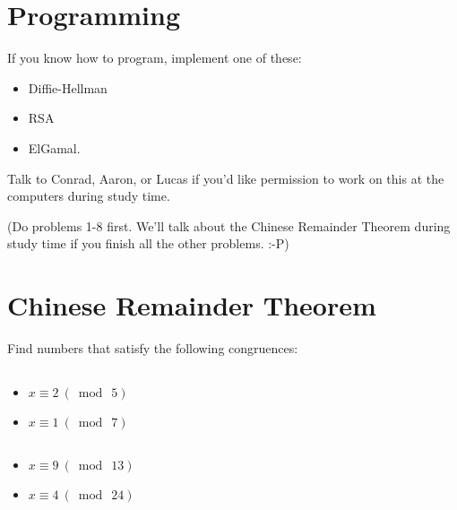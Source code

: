 \documentclass[12pt]{article}
\begin{document}
\section{Programming}

If you know how to program, implement one of these: 

\begin{itemize}
\item Diffie-Hellman
\item RSA
\item ElGamal.
\end{itemize}


Talk to Conrad, Aaron, or Lucas if you'd like permission to work on this at the computers during study time.


\newpage

(Do problems 1-8 first. We'll talk about the Chinese Remainder Theorem during study time if you finish all the other problems. :-P)

\section{Chinese Remainder Theorem}

Find numbers that satisfy the following congruences:

\subsection{}

\begin{itemize}
\item $x \equiv 2 ~(\bmod~5)$
\item $x \equiv 1 ~(\bmod~7)$
\end{itemize}


\subsection{}

\begin{itemize}
\item $x \equiv 9 ~(\bmod~13)$
\item $x \equiv 4 ~(\bmod~24)$
\end{itemize}


\subsection{}
\end{document}
